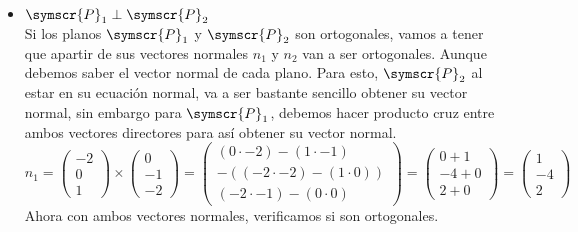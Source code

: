 \documentclass{article}
\def\fancyP{\symscr{P}}
\begin{document}
\begin{enumerate}
\begin{itemize}
            \begin{itemize}
                \item \(\fancyP_1 \perp \fancyP_2\) \\
                    Si los planos \(\fancyP_1\) y \(\fancyP_2\) son ortogonales, vamos a tener que apartir de sus vectores normales \(n_1\) y \(n_2\) 
                    van a ser ortogonales. Aunque debemos saber el vector normal de cada plano. Para esto, \(\fancyP_2\) al estar en su ecuación normal,
                    va a ser bastante sencillo obtener su vector normal, sin embargo para \(\fancyP_1\), debemos hacer producto cruz entre ambos vectores directores
                    para así obtener su vector normal.
                    \[
                        n_1 = 
                        \begin{pmatrix}
                            -2 \\ 0 \\ 1
                        \end{pmatrix}
                        \times
                        \begin{pmatrix}
                            0 \\ -1 \\ -2
                        \end{pmatrix}
                        =
                        \begin{pmatrix}
                            (0 \cdot -2) - (1 \cdot -1) \\
                            -( (-2 \cdot -2) - (1 \cdot 0) ) \\
                            (-2 \cdot -1) - (0 \cdot 0)
                        \end{pmatrix}
                        =
                        \begin{pmatrix}
                            0 + 1 \\
                            -4 + 0 \\
                            2 + 0
                        \end{pmatrix}
                        =
                        \begin{pmatrix}
                            1 \\ -4 \\ 2
                        \end{pmatrix}
                    \]
                    Ahora con ambos vectores normales, verificamos si son ortogonales.

\end{itemize}
\end{itemize}
\end{enumerate}
\end{document}
